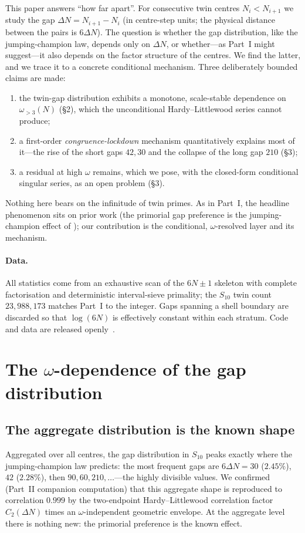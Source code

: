 \documentclass[11pt]{article}
\theoremstyle{remark}\newtheorem{remark}{Remark}
\begin{document}
This paper answers ``how far apart''. For consecutive twin centres
$N_i<N_{i+1}$ we study the gap $\Delta N=N_{i+1}-N_i$ (in centre-step units; the
physical distance between the pairs is $6\Delta N$). The question is whether the
gap distribution, like the jumping-champion law, depends only on $\Delta N$, or
whether---as Part~I might suggest---it also depends on the factor structure of
the centres. We find the latter, and we trace it to a concrete conditional
mechanism. Three deliberately bounded claims are made:
\begin{enumerate}[label=(\roman*)]
  \item the twin-gap distribution exhibits a monotone, scale-stable dependence
        on $\omega_{>3}(N)$ (\S2), which the unconditional Hardy--Littlewood
        series cannot produce;
  \item a first-order \emph{congruence-lockdown} mechanism quantitatively
        explains most of it---the rise of the short gaps $42,30$ and the
        collapse of the long gap $210$ (\S3);
  \item a residual at high $\omega$ remains, which we pose, with the closed-form
        conditional singular series, as an open problem (\S3).
\end{enumerate}
Nothing here bears on the infinitude of twin primes. As in Part~I, the headline
phenomenon sits on prior work (the primorial gap preference is the
jumping-champion effect of \cite{ORW}); our contribution is the conditional,
$\omega$-resolved layer and its mechanism.

\paragraph{Data.}
All statistics come from an exhaustive scan of the $6N\pm1$ skeleton with
complete factorisation and deterministic interval-sieve primality; the $S_{10}$
twin count $23{,}988{,}173$ matches Part~I to the integer. Gaps spanning a shell
boundary are discarded so that $\log(6N)$ is effectively constant within each
stratum. Code and data are released openly~\cite{repo2}.

\section{The $\omega$-dependence of the gap distribution}

\subsection{The aggregate distribution is the known shape}
Aggregated over all centres, the gap distribution in $S_{10}$ peaks exactly where
the jumping-champion law predicts: the most frequent gaps are $6\Delta N=30$
($2.45\%$), $42$ ($2.28\%$), then $90,60,210,\dots$---the highly divisible
values. We confirmed (Part~II companion computation) that this aggregate shape is
reproduced to correlation $0.999$ by the two-endpoint Hardy--Littlewood
correlation factor $C_2(\Delta N)$ times an $\omega$-independent geometric
envelope. At the aggregate level there is nothing new: the primorial preference
is the known effect.
\end{document}
